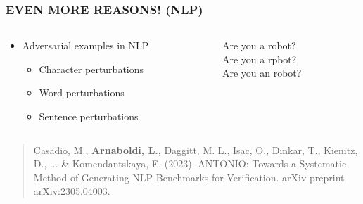 \documentclass[t,compress,aspectratio=169]{beamer}
\begin{document}
\begin{frame}
\frametitle{EVEN MORE REASONS! (NLP)}

\begin{columns}[c]
    \begin{column}{.5\textwidth}    \Large

        \begin{itemize}
            \item Adversarial examples in NLP
            \begin{itemize}    \Large

                \item \textcolor{aisecred}{Character perturbations}
                \item Word perturbations
                \item Sentence perturbations
            \end{itemize}
        \end{itemize}
    \end{column}
    \begin{column}{.5\textwidth}
    \begin{center}    \Large

        \textcolor{aisecpurple}{Are you a robot?}\\
        \textcolor{aisecpurple}{Are you a r}\textcolor{aisecred}{p}\textcolor{aisecpurple}{bot?}\\
        \textcolor{aisecpurple}{Are you a}\textcolor{aisecred}{n }\textcolor{aisecpurple}{robot?}
    \end{center}
    \end{column}
\end{columns}
\vfill
	\begin{quote}
		\tiny Casadio, M., \textbf{\textbf{Arnaboldi, L.}}, Daggitt, M. L., Isac, O., Dinkar, T., Kienitz, D., ... \& Komendantskaya, E. (2023). ANTONIO: Towards a Systematic Method of Generating NLP Benchmarks for Verification. arXiv preprint arXiv:2305.04003.

	\end{quote}
\end{frame}
\end{document}
